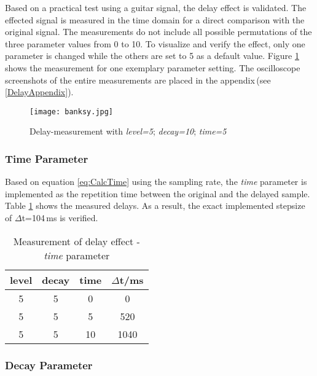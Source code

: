 Based on a practical test using a guitar signal, the delay effect is validated.
The effected signal is measured in the time domain for a direct comparison with the original signal. The measurements do not include all possible permutations of the three parameter values from 0 to 10. To visualize and verify the effect, only one parameter is changed while the others are set to 5 as a default value.
Figure \ref{fig:DelayExemp} shows the measurement for one exemplary parameter setting.
The oscilloscope screenshots of the entire measurements are placed in the appendix\,(see \ref{DelayAppendix}).

\begin{figure}[H]
	\centering \texttt{[image: banksy.jpg]}
	\caption[Menu]{Delay-measurement with \textit{level=5}; \textit{decay=10}; \textit{time=5}}
	\label{fig:DelayExemp}
\end{figure}


\subsubsection{Time Parameter}

Based on equation \ref{eq:CalcTime} using the sampling rate, the \textit{time} parameter is implemented as the repetition time between the original and the delayed sample. Table \ref{tab:time parameter} shows the measured delays. As a result, the exact implemented stepsize of $\Delta$t=104\,ms is verified. 

\begin{table}[H]
\begin{center}
\begin{tabular}{|c|c|c||c|}
\hline 
\textbf{level} & \textbf{decay} & \textbf{time} & $\Delta$t/ms \\ 
\hline 
\hline
5 & 5 & 0 & 0 \\ 
\hline 
5 & 5 & 5 & 520 \\ 
\hline 
5 & 5 & 10 & 1040 \\ 
\hline 
\end{tabular} 
\end{center}
\caption{Measurement of delay effect - \textit{time} parameter}
\label{tab:time parameter}
\end{table}



\subsubsection{Decay Parameter}

